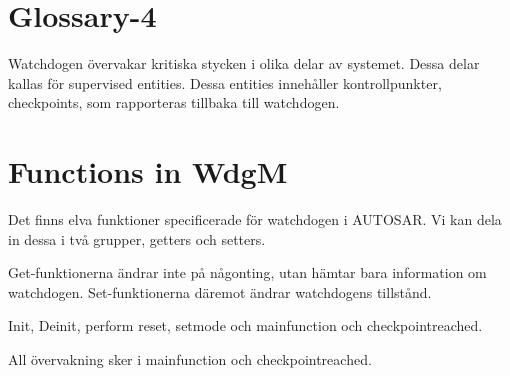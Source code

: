 \documentclass[a4paper]{article}
\begin{document}
\section{Glossary-4}
Watchdogen övervakar kritiska stycken i olika delar av systemet. Dessa
delar kallas för supervised entities. Dessa entities innehåller
kontrollpunkter, checkpoints, som rapporteras tillbaka till watchdogen.



\section{Functions in WdgM}
Det finns elva funktioner specificerade för watchdogen i AUTOSAR.
Vi kan dela in dessa i två grupper, getters och setters.


Get-funktionerna ändrar inte på någonting, utan hämtar bara
information om watchdogen.
Set-funktionerna däremot ändrar watchdogens tillstånd.

Init, Deinit, perform reset, setmode och
mainfunction och checkpointreached.

All övervakning sker i mainfunction och checkpointreached.






\end{document}

